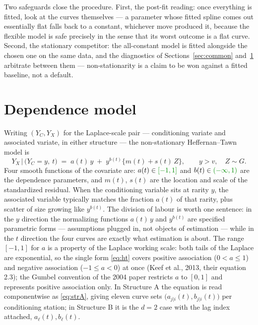 \documentclass[11pt]{article}
\begin{document}
Two safeguards close the procedure. First, the post-fit reading: once everything is fitted, look at the curves themselves --- a parameter whose fitted spline comes out essentially flat falls back to a constant, whichever move produced it, because the flexible model is safe precisely in the sense that its worst outcome is a flat curve. Second, the stationary competitor: the all-constant model is fitted alongside the chosen one on the same data, and the diagnostics of Sections~\ref{sec:common} and~\ref{sec:dep} arbitrate between them --- non-stationarity is a claim to be won against a fitted baseline, not a default.

\section{Dependence model}\label{sec:dep}

Writing $(Y_C, Y_X)$ for the {\color{green}Laplace}-scale pair --- conditioning variate and associated variate, in either structure --- the non-stationary Heffernan--Tawn model is
\begin{equation}\label{eq:ht}
Y_X \,\big|\, \bigl(Y_C = y,\ t\bigr) \;=\; a(t)\, y \;+\; y^{b(t)} \bigl\{ m(t) + s(t)\, Z \bigr\}, \qquad y > v, \quad Z \sim G.
\end{equation}
Four smooth functions of the covariate are: $a(t) \in {\color{green}[-1, 1]}$ and $b(t) \in {\color{green}(-\infty, 1)}$ are the dependence parameters, and $m(t)$, $s(t)$ are the location and scale of the standardized residual. When the conditioning variable sits at rarity $y$, the associated variable typically matches the fraction $a(t)$ of that rarity, plus scatter of size growing like $y^{b(t)}$. The division of labour is worth one sentence: in the $y$ direction the normalizing functions $a(t)\, y$ and $y^{b(t)}$ are specified parametric forms --- assumptions plugged in, not objects of estimation --- while in the $t$ direction the four curves are exactly what estimation is about. {\color{green}The range $[-1, 1]$ for $a$ is a property of the Laplace working scale: both tails of the Laplace are exponential, so the single form \eqref{eq:ht} covers positive association ($0 < a \le 1$) and negative association ($-1 \le a < 0$) at once (Keef et al., 2013, their equation 2.3); the Gumbel convention of the 2004 paper restricts $a$ to $[0, 1]$ and represents positive association only.} In Structure A the equation is read componentwise as \eqref{eq:strA}, giving eleven curve sets $\bigl(a_{j|i}(t), b_{j|i}(t)\bigr)$ per conditioning station; in Structure B it is the $d = 2$ case with the lag index attached, $a_\ell(t), b_\ell(t)$.
\end{document}
